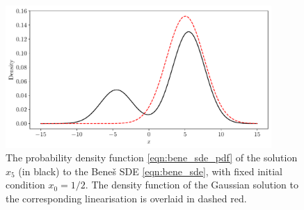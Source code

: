 \begin{figure}
	\centering
	\includegraphics[width=0.9\textwidth]{chp05_gmm/figures/bene_final_gauss_5.0.pdf}
	\caption{The probability density function \cref{eqn:bene_sde_pdf} of the solution \(x_5\) (in black) to the Bene\v{s} SDE \cref{eqn:bene_sde}, with fixed initial condition \(x_0 = 1/2\).
		The density function of the Gaussian solution to the corresponding linearisation is overlaid in dashed red.}
	\label{fig:bene_gauss}
\end{figure}

